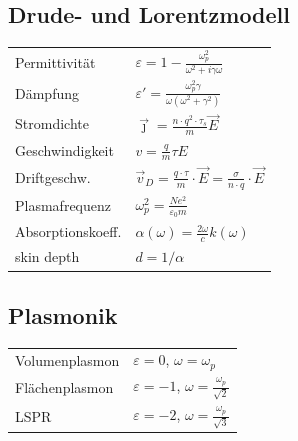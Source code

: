 \documentclass[12pt,a4paper]{article}
\renewcommand{\=}[1]{\stackrel{#1}{=}}
\newcommand{\js}{\vec \jmath}
\newcommand{\eps}{\varepsilon}
\theoremstyle{definition}
\theoremstyle{remark}
\begin{document}
\begin{center}
\begin{minipage}[t]{.5\linewidth}
\subsection{Drude- und Lorentzmodell}
\vspace{0pt}
\noindent\begin{tabular}{ll}
Permittivität & $\varepsilon = 1 - \frac{\omega_p^2}{\omega^2 + i \gamma \omega}$\\
Dämpfung & $\eps' = \frac{\omega_p^2 \gamma}{\omega(\omega^2 + \gamma^2)}$\\
Stromdichte & $\js =\frac{n \cdot q^2 \cdot \tau_s}{m} \vec{E}$\\
Geschwindigkeit & $v = \frac{q}{m} \tau E$\\
Driftgeschw. & $\vec{v}_D = \frac{q \cdot \tau}{m} \cdot \vec{E} = \frac{\sigma}{n \cdot q} \cdot \vec{E}$\\
Plasmafrequenz &  $\omega_p^2 = \frac{N e^2}{\varepsilon_0 m}$\\
Absorptionskoeff. & $\alpha(\omega) = \frac{2\omega}{c}k(\omega)$\\
skin depth & $d = 1/\alpha$

\end{tabular}
\end{minipage}%
\begin{minipage}[t]{.5\linewidth}
\subsection{Plasmonik}
\vspace{0pt}
\begin{tabular}{ll}
Volumenplasmon & $\eps = 0$, $\omega = \omega_p$\\
Flächenplasmon & $\eps = -1$, $\omega = \frac{\omega_p}{\sqrt{2}}$\\
LSPR & $\eps = -2$, $\omega = \frac{\omega_p}{\sqrt{3}}$\\
\end{tabular}
\end{minipage}
\end{center}
\end{document}
